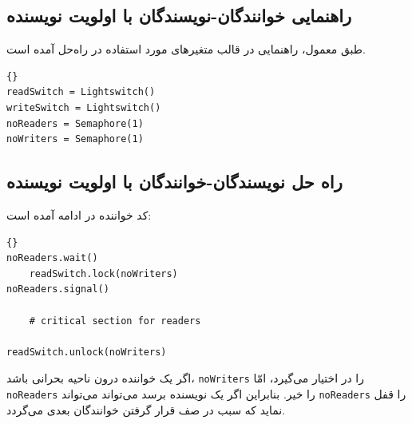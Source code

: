 \documentclass{book}
\newcommand{\clearemptydoublepage}{\newpage\cleardoublepage}
\begin{document}
\clearemptydoublepage
\subsection{راهنمایی خوانندگان-نویسندگان با اولویت نویسنده}

    طبق معمول،‌ راهنمایی در قالب متغیرهای مورد استفاده در راه‌حل آمده است. 

\begin{latin}
\begin{lstlisting}[title=\rl{مقداردهی اولیه خوانندگان-نویسندگان با اولویت نویسنده}]{}
readSwitch = Lightswitch()
writeSwitch = Lightswitch()
noReaders = Semaphore(1)
noWriters = Semaphore(1)
\end{lstlisting}
\end{latin}



\clearemptydoublepage
\subsection{راه حل نویسندگان-خوانندگان با اولویت نویسنده}


    کد خواننده در ادامه آمده است:

\begin{latin}
\begin{lstlisting}[title=\rl{راه حل خواننده با اولویت نویسنده}]{}
noReaders.wait()
    readSwitch.lock(noWriters)
noReaders.signal()

    # critical section for readers

readSwitch.unlock(noWriters)
\end{lstlisting}
\end{latin}

    اگر یک خواننده درون ناحیه بحرانی باشد، {\tt noWriters} را در اختیار می‌گیرد، امّا {\tt noReaders} را خیر. 
    بنابراین اگر یک نویسنده برسد می‌تواند می‌تواند {\tt noReaders} را قفل نماید که سبب در صف قرار گرفتن خوانندگان بعدی می‌گردد. 
\end{document}
